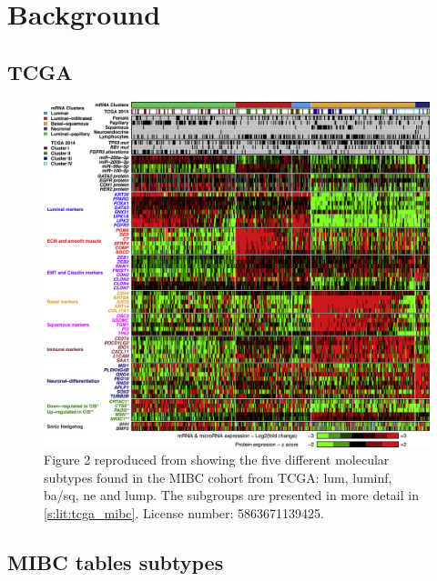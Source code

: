 \chapter{Background} \label{s:ap:intro}

\newpage

\section{TCGA}

\begin{figure}[!htb]    
    \centering
    \includegraphics[width=1.0\textwidth,keepaspectratio]{Sections/Lit_review/Resources/TCGA_2017_subtypes.jpg}
        \caption[Summary of TCGA subgroups]{Figure 2 reproduced from \citet{Robertson2017-mg} showing the five different molecular subtypes found in the MIBC cohort from TCGA: \acrfull{lum}, \acrfull{luminf}, \acrfull{ba/sq}, \acrfull{ne} and \acrfull{lump}. The subgroups are presented in more detail in \cref{s:lit:tcga_mibc}. License number: 5863671139425.}
        \label{fig:ap:tcga_subtypes}
\end{figure}

\newpage

\section{MIBC tables subtypes}

